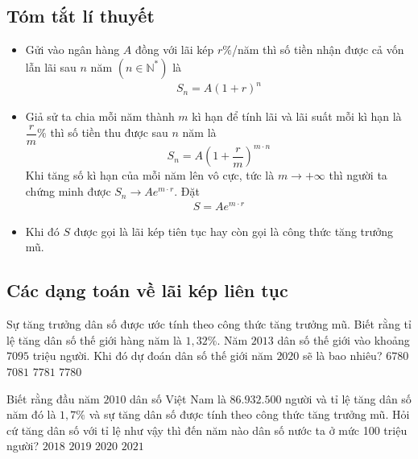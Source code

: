 \subsection{Tóm tắt lí thuyết}
\begin{itemize}
	\item Gửi vào ngân hàng $A$  đồng với lãi kép $r\%$/năm thì số tiền nhận được cả vốn lẫn lãi sau $n$ năm $\left( n\in \mathbb{N}^*\right)$ là 
	\begin{eqnarray}
	\boxed{S_{n}=A\left(1+r\right)^n}
	\end{eqnarray}
	\item Giả sử ta chia mỗi năm thành $m$ kì hạn để tính lãi và lãi suất mỗi kì hạn là $\dfrac{r}{m}\%$ thì số tiền thu được sau $n$ năm là  $$S_n=A\left(1+\dfrac{r}{m}\right)^{m\cdot n}$$
	Khi tăng số kì hạn của mỗi năm lên vô cực, tức là $m\to +\infty$ thì người ta chứng minh được $S_n\to Ae^{m\cdot r}$. Đặt 
	\begin{eqnarray}
	\boxed{S=Ae^{m\cdot r}}
	\end{eqnarray}
	\item Khi đó $S$ được gọi là lãi kép tiên tục hay còn gọi là công thức tăng trưởng mũ.
\end{itemize}
\subsection{Các dạng toán về lãi kép liên tục}
\begin{vd}%
	Sự tăng trưởng dân số được ước tính theo công thức tăng trưởng mũ. Biết rằng tỉ lệ tăng dân số thế giới hàng năm là $1,32\%$. Năm $2013$ dân số thế giới vào khoảng $7095$ triệu người. Khi đó dự đoán dân số thế giới năm $2020$ sẽ là bao nhiêu?\newline
	\choice
	{$6780$}
	{$7081$}
	{\True $7781$}
	{$7780$}
\end{vd}

\begin{vd}%
	Biết rằng đầu năm $2010$ dân số Việt Nam là $86.932.500$ người và tỉ lệ tăng dân số năm đó là $1,7\%$ và sự tăng dân số được tính theo công thức tăng trưởng mũ. Hỏi cứ tăng dân số với tỉ lệ như vậy thì đến năm nào dân số nước ta ở mức 100 triệu người?\newline
	\choice
	{\True $2018$}
	{$2019$}
	{$2020$}
	{$2021$}
\end{vd}

